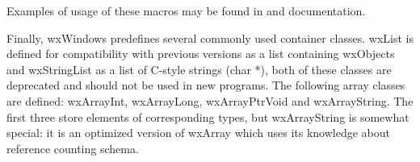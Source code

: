 Examples of usage of these macros may be found in  and 
 documentation.

Finally, wxWindows predefines several commonly used container classes. wxList
is defined for compatibility with previous versions as a list containing
wxObjects and wxStringList as a list of C-style strings (char *), both of these
classes are deprecated and should not be used in new programs. The following
array classes are defined: wxArrayInt, wxArrayLong, wxArrayPtrVoid and
wxArrayString. The first three store elements of corresponding types, but
wxArrayString is somewhat special: it is an optimized version of wxArray which
uses its knowledge about  reference counting
schema.

